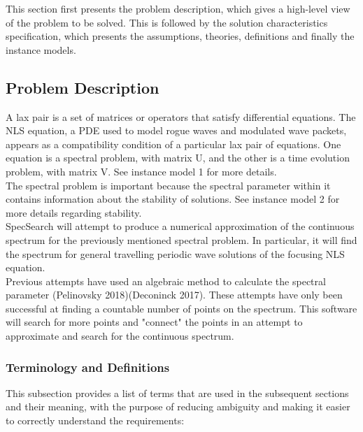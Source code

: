\documentclass[12pt]{article}
\begin{document}
This section first presents the problem description, which gives a high-level
view of the problem to be solved.  This is followed by the solution 
characteristics specification, which presents the assumptions, theories, 
definitions and finally the instance models. 

\subsection{Problem Description} \label{Sec_pd}
A lax pair is a set of matrices or operators that satisfy differential 
equations. The NLS equation, a PDE used to model rogue waves and modulated wave 
packets, appears as a compatibility condition of a particular lax pair of 
equations. One equation is a spectral problem, with matrix U, and the other is 
a time evolution problem, with matrix V. See instance model 1 for more 
details.\\

 The 
spectral problem is important because the spectral 
parameter within it contains information about the stability of solutions. See 
instance model 2 for more details regarding stability.\\

SpecSearch will attempt to produce a numerical approximation of the continuous 
spectrum for the previously mentioned spectral problem. In particular, 
it will find the spectrum for general travelling periodic wave solutions of the 
focusing
NLS equation. \\ 

Previous attempts have used an algebraic method to calculate the spectral 
parameter (Pelinovsky 2018)(Deconinck 2017). These attempts have only been 
successful at finding a countable number of points on the spectrum. This 
software will 
search for more points and "connect" the points in an attempt to approximate 
and search for the continuous spectrum. 
\\ 

\subsubsection{Terminology and  Definitions}

This subsection provides a list of terms that are used in the subsequent
sections and their meaning, with the purpose of reducing ambiguity and making it
easier to correctly understand the requirements:
\end{document}
